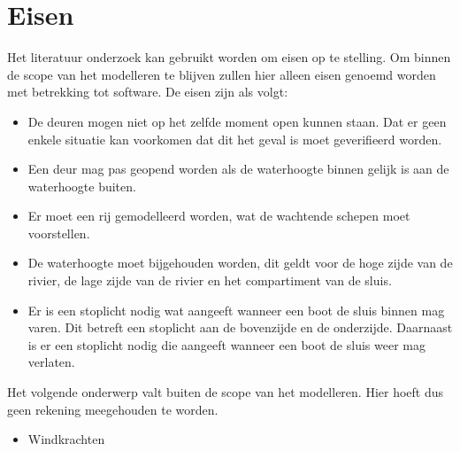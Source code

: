 \documentclass{article}
\begin{document}
\section{Eisen} %
Het literatuur onderzoek kan gebruikt worden om eisen op te stelling. Om binnen de scope van het modelleren te blijven zullen hier alleen eisen genoemd worden met betrekking tot software. De eisen zijn als volgt:
\begin{itemize}
\item De deuren mogen niet op het zelfde moment open kunnen staan. Dat er geen enkele situatie kan voorkomen dat dit het geval is moet geverifieerd worden.

\item Een deur mag pas geopend worden als de waterhoogte binnen gelijk is aan de waterhoogte buiten.

\item Er moet een rij gemodelleerd worden, wat de wachtende schepen moet voorstellen.

\item De waterhoogte moet bijgehouden worden, dit geldt voor de hoge zijde van de rivier, de lage zijde van de rivier en het compartiment van de sluis.

\item Er is een stoplicht nodig wat aangeeft wanneer een boot de sluis binnen mag varen. Dit betreft een stoplicht aan de bovenzijde en de onderzijde. Daarnaast is er een stoplicht nodig die aangeeft wanneer een boot de sluis weer mag verlaten.


\end{itemize}

Het volgende onderwerp valt buiten de scope van het modelleren. Hier hoeft dus geen rekening meegehouden te worden.
\begin{itemize}
\item Windkrachten
\end{itemize}
\end{document}
